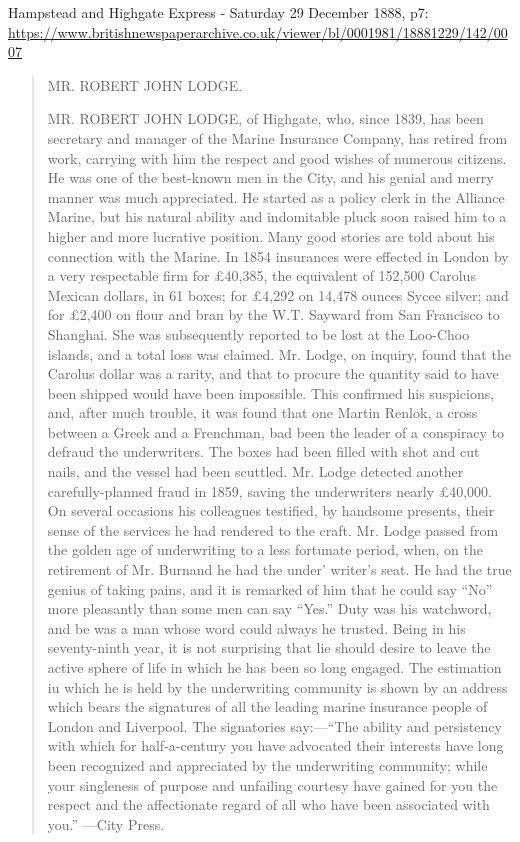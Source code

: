 
Hampstead and Highgate Express - Saturday 29 December 1888, p7:
\url{https://www.britishnewspaperarchive.co.uk/viewer/bl/0001981/18881229/142/0007}

\begin{quotation}
MR. ROBERT JOHN LODGE.

MR. ROBERT JOHN LODGE, of Highgate, who, since 1839, has been secretary and manager of the Marine Insurance Company,
has retired from work, carrying with him the respect and good wishes of numerous citizens.
He was one of the best-known men in the City, and his genial and merry manner was much appreciated.
He started as a policy clerk in the Alliance Marine,
but his natural ability and indomitable pluck soon raised him to a higher and more lucrative position.
Many good stories are told about his connection with the Marine.
In 1854 insurances were effected in London by a very respectable firm for £40,385, the equivalent of 152,500 Carolus Mexican dollars,
in 61 boxes; for £4,292 on 14,478 ounces Sycee silver; and for £2,400 on flour and bran by the W.T. Sayward from San Francisco to Shanghai.
She was subsequently reported to be lost at the Loo-Choo islands, and a total loss was claimed.
Mr. Lodge, on inquiry, found that the Carolus dollar was a rarity,
and that to procure the quantity said to have been shipped would have been impossible.
This confirmed his suspicions, and, after much trouble, it was found that one Martin Renlok,
a cross between a Greek and a Frenchman, bad been the leader of a conspiracy to defraud the underwriters.
The boxes had been filled with shot and cut nails, and the vessel had been scuttled.
Mr. Lodge detected another carefully-planned fraud in 1859, saving the underwriters nearly £40,000.
On several occasions his colleagues testified, by handsome presents, their sense of the services he had rendered to the craft.
Mr. Lodge passed from the golden age of underwriting to a less fortunate period, when,
on the retirement of Mr. Burnand he had the under' writer's seat. He had the true genius of taking pains,
and it is remarked of him that he could say ``No'' more pleasantly than some men can say ``Yes.''
Duty was his watchword, and be was a man whose word could always he trusted. Being in his seventy-ninth year,
it is not surprising that lie should desire to leave the active sphere of life in which he has been so long engaged.
The estimation iu which he is held by the underwriting community is shown by an address which bears the signatures of
all the leading marine insurance people of London and Liverpool.
The signatories say:---``The ability and persistency with which for half-a-century you have advocated their interests
have long been recognized and appreciated by the underwriting community; while your singleness of purpose and
unfailing courtesy have gained for you the respect and the affectionate regard of all who have been associated with you.''
---City Press.
\end{quotation}

